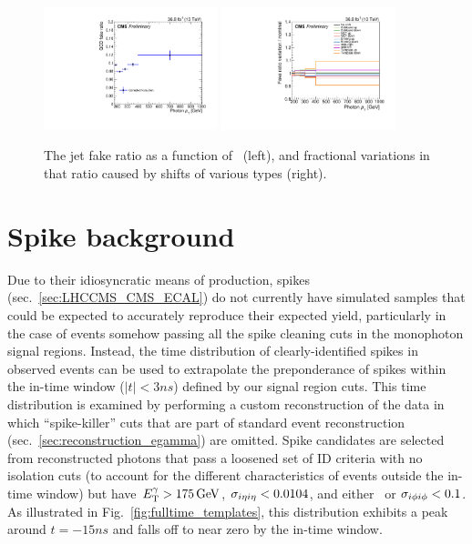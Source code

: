 \begin{figure}[hbtp]
  \begin{center}
  \includegraphics[width=0.45\textwidth]{Figures/QCD/QCDfake_fakeratio.pdf}
  \includegraphics[width=0.45\textwidth]{Figures/QCD/QCDfake_systematics.pdf}
  \caption{The jet fake ratio as a function of \ETgamma\ (left), and fractional variations in that ratio caused by shifts of various types (right).}
  \label{fig:qcd_fake_ratio}
  \end{center}
\end{figure}

\section{Spike background} \label{sec:background_estimation_spikes}
Due to their idiosyncratic means of production, spikes (sec.~\ref{sec:LHCCMS_CMS_ECAL}) do not currently have simulated samples that could be expected to accurately reproduce their expected yield,
particularly in the case of events somehow passing all the spike cleaning cuts in the monophoton signal regions. Instead, the time distribution of clearly-identified
spikes in observed events can be used to extrapolate the preponderance of spikes within the in-time window ($|t|<3\unit{ns}$) defined by our signal region cuts.
This time distribution is examined by performing a custom reconstruction of the data in which ``spike-killer'' cuts that are part of standard event reconstruction (sec.~\ref{sec:reconstruction_egamma})
are omitted. Spike candidates are selected from reconstructed photons that pass a loosened set of ID criteria with no isolation cuts (to account for the different
characteristics of events outside the in-time window) but have $\ETgamma > 175\unit{GeV}$, $\sieie < 0.0104$, and either \sieie\ or $\sipip < 0.1$.
As illustrated in Fig.~\ref{fig:fulltime_templates}, this distribution exhibits a peak around $t = -15\unit{ns}$ and falls off to near zero by the in-time window.

